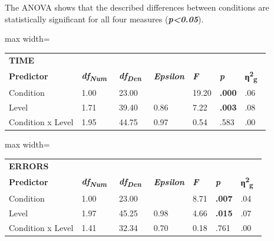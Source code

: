 \documentclass[sigconf]{nimeart}
\begin{document}
The ANOVA shows that the described differences between conditions are statistically significant for all four measures (\textbf{\emph{p\textless0.05}}).

\begin{table}[htbp]\centering\small
\begin{adjustbox}{max width=\textwidth}\begin{tabular}{lllllll}
\toprule
\midrule
\multicolumn{7}{l}{%
\textbf{TIME}} \\
\textbf{Predictor} & \textbf{\emph{df}}\textsubscript{\textbf{\emph{Num~}}} & \textbf{\emph{df}}\textsubscript{\textbf{\emph{Den~}}} & \textbf{\emph{Epsilon}} & \textbf{\emph{F}} & \textbf{\emph{p}} & \textbf{η}\textsuperscript{\textbf{2}}\textsubscript{\textbf{g~}} \\
Condition & 1.00 & 23.00 & 
 & 19.20 & \textbf{.000} & .06 \\
Level & 1.71 & 39.40 & 0.86 & 7.22 & \textbf{.003} & .08 \\
Condition x Level & 1.95 & 44.75 & 0.97 & 0.54 & .583 & .00 \\
\bottomrule
\end{tabular}\end{adjustbox}\end{table}

\begin{table}[htbp]\centering\small
\begin{adjustbox}{max width=\textwidth}\begin{tabular}{lllllll}
\toprule
\midrule
\multicolumn{7}{l}{%
\textbf{ERRORS}} \\
\textbf{Predictor} & \textbf{\emph{df}}\textsubscript{\textbf{\emph{Num~}}} & \textbf{\emph{df}}\textsubscript{\textbf{\emph{Den~}}} & \textbf{\emph{Epsilon}} & \textbf{\emph{F}} & \textbf{\emph{p}} & \textbf{η}\textsuperscript{\textbf{2}}\textsubscript{\textbf{g~}} \\
Condition & 1.00 & 23.00 & 
 & 8.71 & \textbf{.007} & .04 \\
Level & 1.97 & 45.25 & 0.98 & 4.66 & \textbf{.015} & .07 \\
Condition x Level & 1.41 & 32.34 & 0.70 & 0.18 & .761 & .00 \\
\bottomrule
\end{tabular}\end{adjustbox}\end{table}
\end{document}

